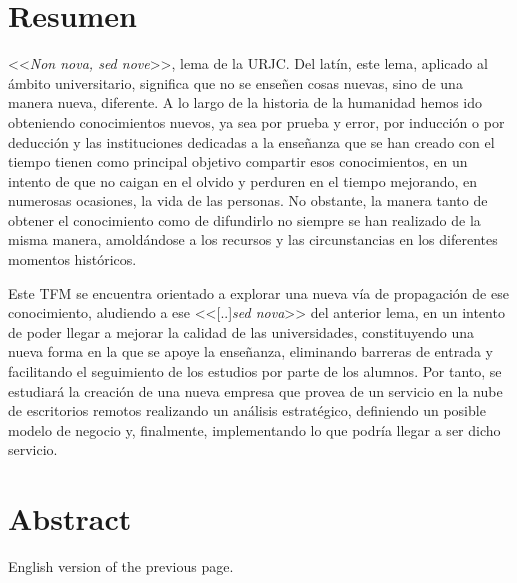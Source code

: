 \chapter{Resumen}

<<\textit{Non nova, sed nove}>>, lema de la \acf{URJC}. Del latín, este lema, aplicado al ámbito universitario, significa que no se enseñen cosas nuevas, sino de una manera nueva, diferente. A lo largo de la historia de la humanidad hemos ido obteniendo conocimientos nuevos, ya sea por prueba y error, por inducción o por deducción y las instituciones dedicadas a la enseñanza que se han creado con el tiempo tienen como principal objetivo compartir esos conocimientos, en un intento de que no caigan en el olvido y perduren en el tiempo mejorando, en numerosas ocasiones, la vida de las personas. No obstante, la manera tanto de obtener el conocimiento como de difundirlo no siempre se han realizado de la misma manera, amoldándose a los recursos y las circunstancias en los diferentes momentos históricos.

Este \acf{TFM} se encuentra orientado a explorar una nueva vía de propagación de ese conocimiento, aludiendo a ese <<[..]\textit{sed nova}>> del anterior lema, en un intento de poder llegar a mejorar la calidad de las universidades, constituyendo una nueva forma en la que se apoye la enseñanza, eliminando barreras de entrada y facilitando el seguimiento de los estudios por parte de los alumnos. Por tanto, se estudiará la creación de una nueva empresa que provea de un servicio en la nube de escritorios remotos realizando un análisis estratégico, definiendo un posible modelo de negocio y, finalmente, implementando lo que podría llegar a ser dicho servicio.

\chapter{Abstract}

English version of the previous page.
